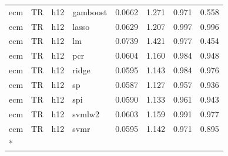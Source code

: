 \begin{ThreePartTable}
\begin{longtable}[t]{llclcccc}
ecm & TR & h12 & gamboost & 0.0662 & 1.271 & 0.971 & 0.558\\
ecm & TR & h12 & lasso & 0.0629 & 1.207 & 0.997 & 0.996\\
ecm & TR & h12 & lm & 0.0739 & 1.421 & 0.977 & 0.454\\
ecm & TR & h12 & pcr & 0.0604 & 1.160 & 0.984 & 0.948\\
ecm & TR & h12 & ridge & 0.0595 & 1.143 & 0.984 & 0.976\\
ecm & TR & h12 & sp & 0.0587 & 1.127 & 0.957 & 0.936\\
ecm & TR & h12 & spi & 0.0590 & 1.133 & 0.961 & 0.943\\
ecm & TR & h12 & svmlw2 & 0.0603 & 1.159 & 0.991 & 0.977\\
ecm & TR & h12 & svmr & 0.0595 & 1.142 & 0.971 & 0.895\\*
\end{longtable}
\end{ThreePartTable}
\endgroup{}
